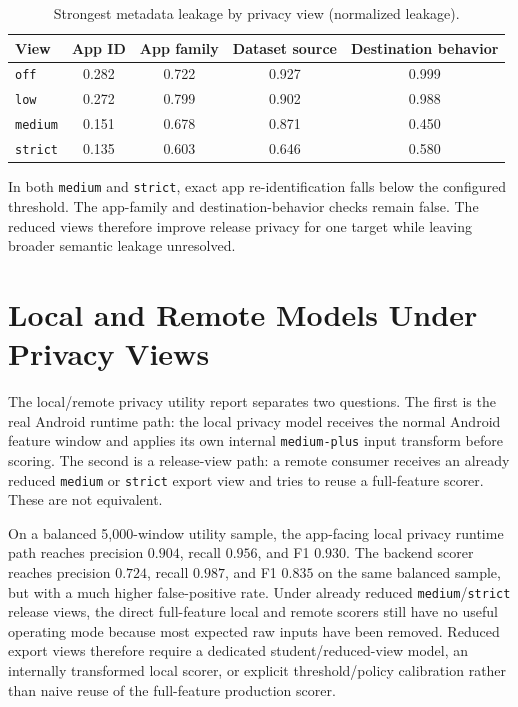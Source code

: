 \begin{table}[htbp]
  \centering
  \caption{Strongest metadata leakage by privacy view (normalized leakage).}
  \label{tab:leakage}
  \small
  \begin{tabular}{lcccc}
    \toprule
    View & App ID & App family & Dataset source & Destination behavior \\
    \midrule
    \texttt{off} & 0.282 & 0.722 & 0.927 & 0.999 \\
    \texttt{low} & 0.272 & 0.799 & 0.902 & 0.988 \\
    \texttt{medium} & 0.151 & 0.678 & 0.871 & 0.450 \\
    \texttt{strict} & 0.135 & 0.603 & 0.646 & 0.580 \\
    \bottomrule
  \end{tabular}
\end{table}

In both \texttt{medium} and \texttt{strict}, exact app re-identification falls below the configured
threshold. The app-family and destination-behavior checks remain false. The reduced views therefore
improve release privacy for one target while leaving broader semantic leakage unresolved.

\section{Local and Remote Models Under Privacy Views}
The local/remote privacy utility report separates two questions. The first is the real Android
runtime path: the local privacy model receives the normal Android feature window and applies its own
internal \texttt{medium-plus} input transform before scoring. The second is a release-view path: a
remote consumer receives an already reduced \texttt{medium} or \texttt{strict} export view and tries
to reuse a full-feature scorer. These are not equivalent.

On a balanced 5,000-window utility sample, the app-facing local privacy runtime path reaches
precision \(0.904\), recall \(0.956\), and F1 \(0.930\). The backend scorer reaches precision
\(0.724\), recall \(0.987\), and F1 \(0.835\) on the same balanced sample, but with a much higher
false-positive rate. Under already reduced \texttt{medium}/\texttt{strict} release views, the direct
full-feature local and remote scorers still have no useful operating mode because most expected raw
inputs have been removed. Reduced export views therefore require a dedicated student/reduced-view
model, an internally transformed local scorer, or explicit threshold/policy calibration rather than
naive reuse of the full-feature production scorer.

